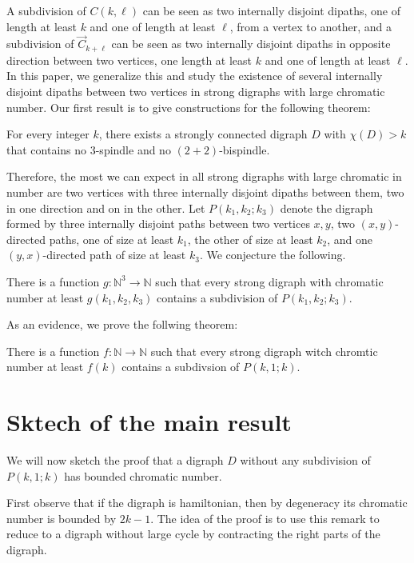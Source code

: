 \documentclass{endm}
\begin{document}
A subdivision of $C(k,\ell)$ can be seen as two internally disjoint dipaths, one of length at least $k$ and one of length at least $\ell$, from a vertex to another, and a subdivision of $\vec{C}_{k+\ell}$ can be seen as two internally disjoint dipaths in opposite direction between two vertices, one length at least $k$ and one of length at least $\ell$.
In this paper, we generalize this and study the existence of several internally disjoint dipaths between two vertices in strong digraphs with large chromatic number.
Our first result is to give constructions for the following theorem: 
\begin{theorem}
For every integer $k$, there exists a strongly connected digraph $D$ with $\chi(D) >k$ that contains no $3$-spindle and no $(2+2)$-bispindle. 
\end{theorem}
Therefore, the most we can expect in all strong digraphs with large chromatic in number are two vertices with three internally disjoint dipaths between them, two in one direction and on in the other.
Let $P(k_1,k_2;k_3)$ denote the digraph formed by three internally disjoint paths between two vertices $x,y$,
two $(x,y)$-directed paths, one of size at least $k_1$, the other of size at least $k_2$, and one $(y,x)$-directed path of size at least $k_3$.
We conjecture the following.

\begin{conjecture}\label{conj:3chemins}
There is a function $g:\mathbb{N}^3 \rightarrow \mathbb{N}$ such that  every strong digraph with chromatic number at least $g(k_1,k_2,k_3)$ contains
a subdivision of $P(k_1,k_2;k_3)$.
\end{conjecture}

As an evidence, we prove the follwing theorem:

\begin{theorem}\label{thm:Pk1k}
There is a function $f: \mathbb{N} \rightarrow \mathbb{N}$  such that every strong digraph witch chromtic number at least $f(k)$ contains
a subdivsion of $P(k,1;k)$.
\end{theorem}

\section{Sktech of the main result}
We will now sketch the proof that a digraph $D$ without any subdivision of $P(k,1;k)$ has bounded chromatic number.

First observe that if the digraph is hamiltonian, then by degeneracy its chromatic number is bounded by $2k-1$.
The idea of the proof is to use this remark to reduce to a digraph without large cycle by contracting the right parts of the digraph.
\end{document}
